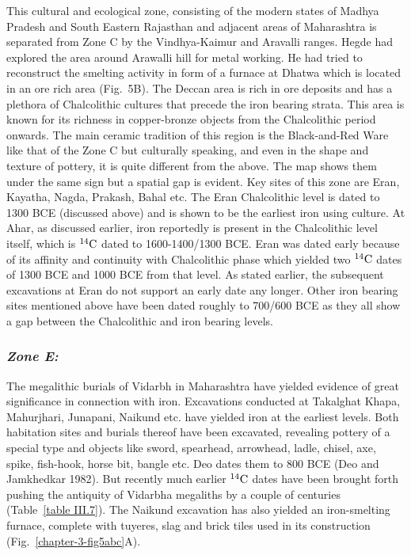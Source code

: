 This cultural and ecological zone, consisting of the modern states of Madhya Pradesh and South Eastern Rajasthan and adjacent areas of Maharashtra is separated from Zone C by the Vindhya-Kaimur and Aravalli ranges. Hegde had explored the area around Arawalli hill for metal working. He had tried to reconstruct the smelting activity in form of a furnace at Dhatwa which is located in an ore rich area (Fig.~5B). The Deccan area is rich in ore deposits and has a plethora of Chalcolithic cultures that precede the iron bearing strata. This area is known for its richness in copper-bronze objects from the Chalcolithic period onwards. The main ceramic tradition of this region is the Black-and-Red Ware like that of the Zone C but culturally speaking, and even in the shape and texture of pottery, it is quite different from the above. The map shows them under the same sign but a spatial gap is evident. Key sites of this zone are Eran, Kayatha, Nagda, Prakash, Bahal etc. The Eran Chalcolithic level is dated to 1300 BCE (discussed above) and is shown to be the earliest iron using culture. At Ahar, as discussed earlier, iron reportedly is present in the Chalcolithic level itself, which is $^{14}{\rm C}$ dated to 1600-1400/1300 BCE.  Eran was dated early because of its affinity and continuity with Chalcolithic phase which yielded two $^{14}{\rm C}$ dates of 1300 BCE and 1000 BCE from that level. As stated earlier, the subsequent excavations at Eran do not support an early date any longer. Other iron bearing sites mentioned above have been dated roughly to 700/600 BCE as they all show a gap between the Chalcolithic and iron bearing levels.

\vspace{-.3cm}

\subsubsection*{\textit{Zone E:}}

\vspace{-.2cm}


The megalithic burials of Vidarbh in Maharashtra have yielded evidence of great significance in connection with iron. Excavations conducted at Takalghat ­Khapa, Mahurjhari, Junapani, Naikund etc. have yielded iron at the earliest levels. Both habitation sites and burials thereof have been excavated, revealing pottery of a special type and objects like sword, spearhead, arrowhead, ladle, chisel, axe, spike, fish-hook, horse bit, bangle etc. Deo dates them to 800 BCE (Deo and Jamkhedkar 1982). But recently much earlier $^{14}{\rm C}$ dates have been brought forth pushing the antiquity of Vidarbha megaliths by a couple of centuries (Table~\ref{table III.7}). The Naikund excavation has also yielded an iron-smelting furnace, complete with tuyeres, slag and brick tiles used in its construction (Fig.~\ref{chapter-3-fig5abc}A).

